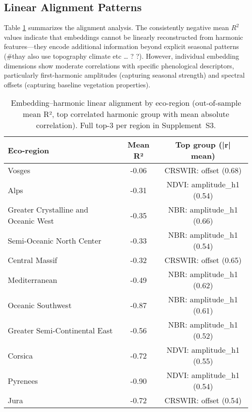 \documentclass[utf8]{FrontiersinHarvard}
\begin{document}
\subsection{Linear Alignment Patterns}

Table \ref{tab:similarity_ecoregion} summarizes the alignment analysis. The consistently negative mean $R^2$ values indicate that embeddings cannot be linearly reconstructed from harmonic features—they encode additional information beyond explicit seasonal patterns (#thay also use topography climate etc … ? ?). However, individual embedding dimensions show moderate correlations with specific phenological descriptors, particularly first-harmonic amplitudes (capturing seasonal strength) and spectral offsets (capturing baseline vegetation properties).

\begin{table}[H]
\centering
\begin{tabular}{lcc}
\hline
\textbf{Eco-region} & \textbf{Mean R²} & \textbf{Top group (|r| mean)} \\ \hline
Vosges & -0.06 & CRSWIR: offset (0.68) \\
Alps & -0.31 & NDVI: amplitude\_h1 (0.54) \\
Greater Crystalline and Oceanic West & -0.35 & NBR: amplitude\_h1 (0.66) \\
Semi-Oceanic North Center & -0.33 & NBR: amplitude\_h1 (0.54) \\
Central Massif & -0.32 & CRSWIR: offset (0.65) \\
Mediterranean & -0.49 & NBR: amplitude\_h1 (0.62) \\
Oceanic Southwest & -0.87 & NBR: amplitude\_h1 (0.61) \\
Greater Semi-Continental East & -0.56 & NBR: amplitude\_h1 (0.52) \\
Corsica & -0.72 & NDVI: amplitude\_h1 (0.55) \\
Pyrenees & -0.90 & NDVI: amplitude\_h1 (0.54) \\
Jura & -0.72 & CRSWIR: offset (0.54) \\ \hline
\end{tabular}
\caption{Embedding–harmonic linear alignment by eco-region (out-of-sample mean R², top correlated harmonic group with mean absolute correlation). Full top-3 per region in Supplement~S3.}
\label{tab:similarity_ecoregion}
\end{table}

\end{document}

